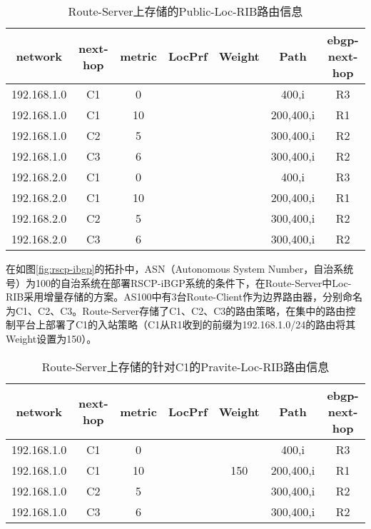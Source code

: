 \begin{table}[h]
	\centering
	\caption{Route-Server上存储的Public-Loc-RIB路由信息}
    \label{tab:weight-example}
	\begin{tabular}{|c|c|c|c|c|c|c|}
		\hline
		network & next-hop & metric & LocPrf & Weight & Path & ebgp-next-hop \\ \hline
		192.168.1.0 & C1 & 0 & &  &400,i & R3 \\ \hline
        192.168.1.0 & C1 & 10 & &  &200,400,i & R1 \\ \hline
        192.168.1.0 & C2 & 5 & &  &300,400,i & R2 \\ \hline
        192.168.1.0 & C3 & 6 & &  &300,400,i & R2 \\ \hline
        192.168.2.0 & C1 & 0 & &  &400,i & R3 \\ \hline
        192.168.2.0 & C1 & 10 & &  &200,400,i & R1 \\ \hline
        192.168.2.0 & C2 & 5 & &  &300,400,i & R2 \\ \hline
        192.168.2.0 & C3 & 6 & &  &300,400,i & R2 \\ \hline
	\end{tabular}
\end{table}

在如图\ref{fig:rscp-ibgp}的拓扑中，ASN（Autonomous System Number，自治系统号）为100的自治系统在部署RSCP-iBGP系统的条件下，在Route-Server中Loc-RIB采用增量存储的方案。AS100中有3台Route-Client作为边界路由器，分别命名为C1、C2、C3。Route-Server存储了C1、C2、C3的路由策略，在集中的路由控制平台上部署了C1的入站策略（C1从R1收到的前缀为192.168.1.0/24的路由将其Weight设置为150）。



\begin{table}[h]
	\centering
	\caption{Route-Server上存储的针对C1的Pravite-Loc-RIB路由信息}
    \label{tab:c1-loc-rib}
	\begin{tabular}{|c|c|c|c|c|c|c|}
		\hline
		network & next-hop & metric & LocPrf & Weight & Path & ebgp-next-hop \\ \hline
		192.168.1.0 & C1 & 0 & &  &400,i & R3 \\ \hline
        192.168.1.0 & C1 & 10 & & 150 &200,400,i & R1 \\ \hline
        192.168.1.0 & C2 & 5 & &  &300,400,i & R2 \\ \hline
        192.168.1.0 & C3 & 6 & &  &300,400,i & R2 \\ \hline
	\end{tabular}
\end{table}

